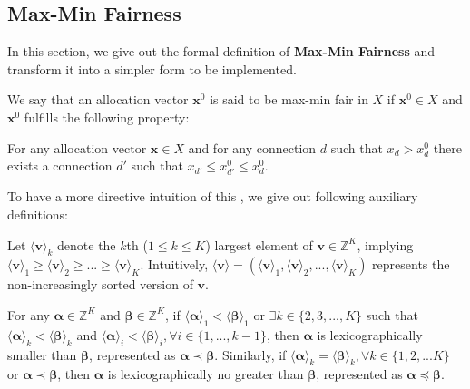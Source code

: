 \documentclass{llncs}
\begin{document}
\subsection{Max-Min Fairness}
In this section, we give out the formal definition of {\bf Max-Min Fairness} and transform it into a simpler form to be implemented.

\begin{definition} {\rm \cite{ref_12}}
\label{def:maxmin}
We say that an allocation vector $\mathbf{x}^0$ is said to be max-min fair in $X$ if $\mathbf{x}^0 \in X$ and $\mathbf{x}^0$ fulfills the following property:

For any allocation vector $\mathbf{x} \in X$ and for any connection $d$ such that $x_d > x_d^0$ there exists a connection $d'$ such that $x_{d'} \leq x_{d'}^0 \leq x_d^0$.
\end{definition}

To have a more directive intuition of this , we give out following auxiliary definitions:
\begin{definition} {\rm \cite{ref_11}}
Let $\langle \mathbf{v} \rangle_k$ denote the $k$th ($1 \leq k \leq K$) largest element of $\mathbf{v} \in \mathbb{Z}^K$, implying $\langle \mathbf{v} \rangle_1 \geq \langle \mathbf{v} \rangle_2 \geq ... \geq \langle \mathbf{v} \rangle_K$. Intuitively, $\langle \mathbf{v} \rangle = (\langle \mathbf{v} \rangle_1, \langle \mathbf{v} \rangle_2, ... , \langle \mathbf{v} \rangle_K)$ represents the non-increasingly sorted version of $\mathbf{v}$.
\end{definition}

\begin{definition} {\rm \cite{ref_11}}
For any $\mathbf{\alpha} \in \mathbb{Z}^K$ and $\mathbf{\beta} \in \mathbb{Z}^K$, if $\langle \mathbf{\alpha} \rangle_1 < \langle \mathbf{\beta} \rangle_1$ or $\exists k \in \{2,3,...,K\}$ such that $\langle \mathbf{\alpha} \rangle_k < \langle \mathbf{\beta} \rangle_k$ and $\langle \mathbf{\alpha} \rangle_i < \langle \mathbf{\beta} \rangle_i, \forall i \in \{1,...,k-1\}$, then $\mathbf{\alpha}$ is lexicographically smaller than $\mathbf{\beta}$, represented as $\mathbf{\alpha} \prec \mathbf{\beta}$. Similarly, if $\langle \mathbf{\alpha} \rangle_k = \langle \mathbf{\beta} \rangle_k, \forall k \in \{1,2,...K\}$ or $\mathbf{\alpha} \prec \mathbf{\beta}$, then $\mathbf{\alpha}$ is lexicographically no greater than $\mathbf{\beta}$, represented as $\mathbf{\alpha} \preceq \mathbf{\beta}$.
\end{definition}
\end{document}
